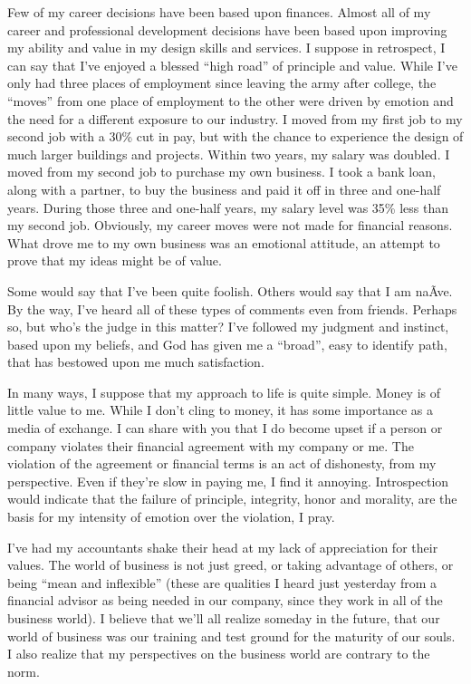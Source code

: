 \documentclass[12pt]{memoir}
\begin{document}
Few of my career decisions have been based upon finances. Almost all
of my career and professional development decisions have been based
upon improving my ability and value in my design skills and services.
I suppose in retrospect, I can say that I've enjoyed a blessed ``high
road'' of principle and value. While I've only had three places of
employment since leaving the army after college, the ``moves'' from
one place of employment to the other were driven by emotion and the
need for a different exposure to our industry. I moved from my first
job to my second job with a 30\% cut in pay, but with the chance to
experience the design of much larger buildings and projects. Within
two years, my salary was doubled. I moved from my second job to purchase
my own business. I took a bank loan, along with a partner, to buy
the business and paid it off in three and one-half years. During those
three and one-half years, my salary level was 35\% less than my second
job. Obviously, my career moves were not made for financial reasons.
What drove me to my own business was an emotional attitude, an attempt
to prove that my ideas might be of value. 

Some would say that I've been quite foolish. Others would say that
I am na\~{A}\textasciimacron ve. By the way, I've heard all of these
types of comments even from friends. Perhaps so, but who's the judge
in this matter? I've followed my judgment and instinct, based upon
my beliefs, and God has given me a ``broad'', easy to identify path,
that has bestowed upon me much satisfaction. 

In many ways, I suppose that my approach to life is quite simple.
Money is of little value to me. While I don't cling to money, it has
some importance as a media of exchange. I can share with you that
I do become upset if a person or company violates their financial
agreement with my company or me. The violation of the agreement or
financial terms is an act of dishonesty, from my perspective. Even
if they're slow in paying me, I find it annoying. Introspection would
indicate that the failure of principle, integrity, honor and morality,
are the basis for my intensity of emotion over the violation, I pray. 

I've had my accountants shake their head at my lack of appreciation
for their values. The world of business is not just greed, or taking
advantage of others, or being ``mean and inflexible'' (these are
qualities I heard just yesterday from a financial advisor as being
needed in our company, since they work in all of the business world).
I believe that we'll all realize someday in the future, that our world
of business was our training and test ground for the maturity of our
souls. I also realize that my perspectives on the business world are
contrary to the norm.
\end{document}
